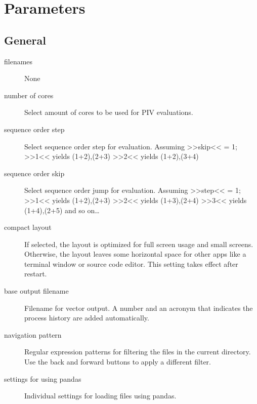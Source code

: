 \documentclass[letterpaper,10pt,english]{sphinxmanual}
\begin{document}
\chapter{Parameters}
\label{\detokenize{parameters:parameters}}\label{\detokenize{parameters::doc}}

\section{General}
\label{\detokenize{parameters:general}}\begin{description}
\item[{filenames}] \leavevmode
None

\item[{number of cores}] \leavevmode
Select amount of cores to be used for PIV evaluations.

\item[{sequence order step}] \leavevmode
Select sequence order step for evaluation.
Assuming \textgreater{}\textgreater{}skip\textless{}\textless{} = 1; 
\textgreater{}\textgreater{}1\textless{}\textless{} yields (1+2),(2+3)
\textgreater{}\textgreater{}2\textless{}\textless{} yields (1+2),(3+4)

\item[{sequence order skip}] \leavevmode
Select sequence order jump for evaluation.
Assuming \textgreater{}\textgreater{}step\textless{}\textless{} = 1; 
\textgreater{}\textgreater{}1\textless{}\textless{} yields (1+2),(2+3)
\textgreater{}\textgreater{}2\textless{}\textless{} yields (1+3),(2+4)
\textgreater{}\textgreater{}3\textless{}\textless{} yields (1+4),(2+5)
and so on…

\item[{compact layout}] \leavevmode
If selected, the layout is optimized for full screen usage and small screens. Otherwise, the layout leaves some horizontal space for other apps like a terminal window or source code editor. This setting takes effect after restart.

\item[{base output filename}] \leavevmode
Filename for vector output. A number and an acronym that indicates the process history are added automatically.

\item[{navigation pattern}] \leavevmode
Regular expression patterns for filtering the files in the current directory. Use the back and forward buttons to apply a different filter.

\item[{settings for using pandas}] \leavevmode
Individual settings for loading files using pandas.


\end{description}
\end{document}
